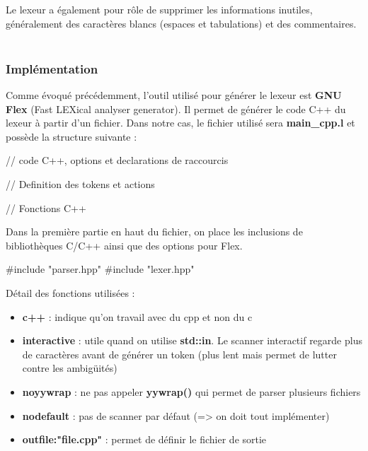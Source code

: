 \documentclass[a4paper]{article}%
\begin{document}
Le lexeur a également pour rôle de supprimer les informations inutiles,
généralement des caractères blancs (espaces et tabulations) et des
commentaires.\\~\\

\subsubsection*{Implémentation}

Comme évoqué précédemment, l'outil utilisé pour générer le lexeur est
\textbf{GNU Flex} (Fast LEXical analyser generator). Il permet de générer le
code C++ du lexeur à partir d'un fichier. Dans notre cas, le fichier utilisé
sera \textbf{main\_cpp.l} et possède la structure suivante
\cite{compilerFlexBison} :

\begin{code}
// code C++, options et declarations de raccourcis

// Definition des tokens et actions

// Fonctions C++
\end{code}\leavevmode\newline

\noindent

Dans la première partie en haut du fichier, on place les inclusions de
bibliothèques C/C++ ainsi que des options pour Flex.

\begin{code}
#include "parser.hpp"
#include "lexer.hpp"

\end{code}\leavevmode\newline

Détail des fonctions utilisées :
\begin{itemize}
  \item \textbf{c++} : indique qu'on travail avec du cpp et non du c
  \item \textbf{interactive} : utile quand on utilise \textbf{std::in}. Le
    scanner interactif regarde plus de caractères avant de générer un token
    (plus lent mais permet de lutter contre les ambigüités)
  \item \textbf{noyywrap} : ne pas appeler \textbf{yywrap()} qui permet de
    parser plusieurs fichiers
  \item \textbf{nodefault} : pas de scanner par défaut (=> on doit tout
    implémenter)
  \item \textbf{outfile:"file.cpp"} : permet de définir le fichier de sortie
\end{itemize}\leavevmode\\
\end{document}
